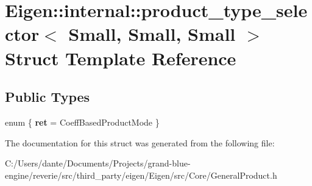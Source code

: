 \hypertarget{struct_eigen_1_1internal_1_1product__type__selector_3_01_small_00_01_small_00_01_small_01_4}{}\section{Eigen\+::internal\+::product\+\_\+type\+\_\+selector$<$ Small, Small, Small $>$ Struct Template Reference}
\label{struct_eigen_1_1internal_1_1product__type__selector_3_01_small_00_01_small_00_01_small_01_4}
\subsection*{Public Types}
\begin{DoxyCompactItemize}
\item 
\mbox{\label{struct_eigen_1_1internal_1_1product__type__selector_3_01_small_00_01_small_00_01_small_01_4_ab9e895d1dc6be59f48a1d81ec991357c}} 
enum \{ {\bfseries ret} = Coeff\+Based\+Product\+Mode
 \}
\end{DoxyCompactItemize}


The documentation for this struct was generated from the following file\+:\begin{DoxyCompactItemize}
\item 
C\+:/\+Users/dante/\+Documents/\+Projects/grand-\/blue-\/engine/reverie/src/third\+\_\+party/eigen/\+Eigen/src/\+Core/General\+Product.\+h\end{DoxyCompactItemize}
